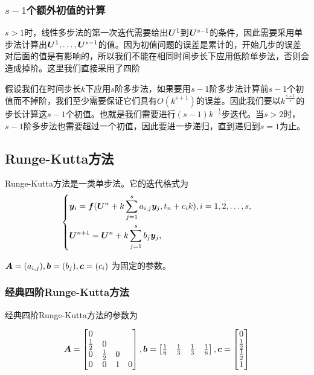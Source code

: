\documentclass[lang=cn,a4paper,newtx,bibend=bibtex]{elegantpaper}
\begin{document}
\subsubsection{$s-1$个额外初值的计算}

$s>1$时，线性多步法的第一次迭代需要给出$\bm{U}^1$到$\bm{U}^{s-1}$的条件，因此需要采用单步法计算出$\bm{U}^1,\dots,\bm{U}^{s-1}$的值。因为初值问题的误差是累计的，开始几步的误差对后面的值是有影响的，所以我们不能在相同时间步长下应用低阶单步法，否则会造成掉阶。这里我们直接采用了四阶

假设我们在时间步长$k$下应用$s$阶多步法，如果要用$s-1$阶多步法计算前$s-1$个初值而不掉阶，我们至少需要保证它们具有$O(k^{s+1})$的误差。因此我们要以$k^{\frac{s+1}s}$的步长计算这$s-1$个初值。也就是我们需要进行$(s-1)k^{-\frac 1s}$步迭代。当$s>2$时，$s-1$阶多步法也需要超过一个初值，因此要进一步递归，直到递归到$s=1$为止。

\subsection{Runge-Kutta方法}

Runge-Kutta方法是一类单步法。它的迭代格式为
\begin{equation*}
    \begin{aligned}
        \left\{
            \begin{aligned}
                & \bm{y}_i = \bm{f}(\bm{U}^n + k\sum_{j=1}^s a_{i,j}\bm{y}_j, t_n+c_ik), i=1,2,\dots,s,\\
                & \bm{U}^{n+1} = \bm{U}^n + k\sum_{j=1}^s b_j\bm{y}_j,
            \end{aligned}
        \right.
    \end{aligned}
\end{equation*}

$\bm{A}=(a_{i,j}), \bm{b}=(b_j), \bm{c}=(c_i)$ 为固定的参数。

\subsubsection{经典四阶Runge-Kutta方法}

经典四阶Runge-Kutta方法的参数为

\begin{equation*}
    \bm{A} = \begin{bmatrix} 
        0 & & & \\
        \frac 12 & 0 & & \\
        0 & \frac 12 & 0 & \\
        0 & 0 & 1 & 0 \\
     \end{bmatrix},
    \bm{b} = \begin{bmatrix} 
        \frac 16 & \frac 13 & \frac 13 & \frac 16 \\
     \end{bmatrix},
    \bm{c} = \begin{bmatrix} 
        0 \\
        \frac 12 \\
        \frac 12 \\
        1 \\
     \end{bmatrix}
\end{equation*}
\end{document}

